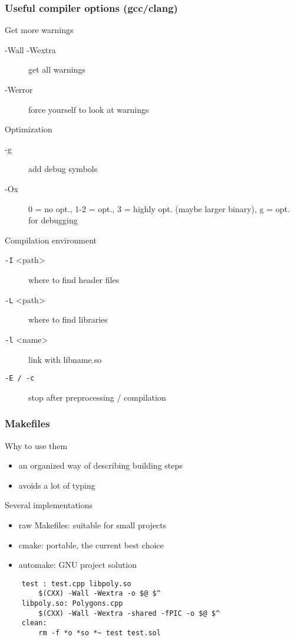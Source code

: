 \begin{frame}[fragile]
  \frametitle{Useful compiler options (gcc/clang)}
  \begin{block}{Get more warnings}
    \begin{description}
      \item[-Wall -Wextra] get all warnings
      \item[-Werror] force yourself to look at warnings
    \end{description}
  \end{block}
  \begin{block}{Optimization}
    \begin{description}
      \item[-g] add debug symbols
      \item[-Ox] 0 = no opt., 1-2 = opt., 3 = highly opt. (maybe larger binary), g = opt. for debugging
    \end{description}
  \end{block}
  \begin{block}{Compilation environment}
    \begin{description}
      \item[\texttt{-I} \textless{}path\textgreater] where to find header files
      \item[\texttt{-L} \textless{}path\textgreater] where to find libraries
      \item[\texttt{-l} \textless{}name\textgreater] link with libname.so
      \item[\texttt{-E / -c}] stop after preprocessing / compilation
    \end{description}
  \end{block}
\end{frame}

\begin{frame}[fragile]
  \frametitle{Makefiles}
  \begin{block}{Why to use them}
    \begin{itemize}
    \item an organized way of describing building steps
    \item avoids a lot of typing
    \end{itemize}
  \end{block}
  \begin{block}{Several implementations}
    \begin{itemize}
    \item raw Makefiles: suitable for small projects
    \item cmake: portable, the current best choice
    \item automake: GNU project solution
    \end{itemize}
  \end{block}
  \begin{verbatim}
    test : test.cpp libpoly.so
        $(CXX) -Wall -Wextra -o $@ $^
    libpoly.so: Polygons.cpp
        $(CXX) -Wall -Wextra -shared -fPIC -o $@ $^
    clean:
        rm -f *o *so *~ test test.sol
  \end{verbatim}
\end{frame}

